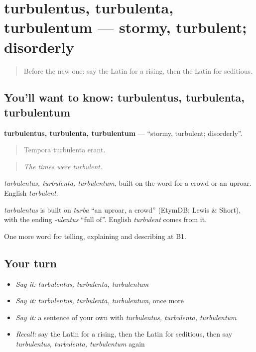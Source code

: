 \section[turbulentus, turbulenta, turbulentum]{turbulentus, turbulenta, turbulentum — stormy, turbulent; disorderly}

\label{lesson:LA-C387-turbulentus}



\begin{quote}
Before the new one: say the Latin for a rising, then the Latin for seditious.
\end{quote}

\subsection*{You'll want to know: turbulentus, turbulenta, turbulentum}
\textbf{turbulentus, turbulenta, turbulentum} — \textquotedblleft{}stormy, turbulent; disorderly\textquotedblright{}.

\begin{quote}
Tempora turbulenta erant.
\end{quote}

\begin{quote}
\emph{The times were turbulent.}
\end{quote}

\emph{turbulentus, turbulenta, turbulentum}, built on the word for a crowd or an uproar. English \emph{turbulent}.

\begin{cousinweb}
\emph{turbulentus} is built on \emph{turba} \textquotedblleft{}an uproar, a crowd\textquotedblright{} (EtymDB; Lewis \& Short), with the ending \emph{-ulentus} \textquotedblleft{}full of\textquotedblright{}. English \emph{turbulent} comes from it.
\end{cousinweb}

\begin{grammarlens}[title={What you've built}]
One more word for telling, explaining and describing at B1.
\end{grammarlens}

\subsection*{Your turn}
\begin{itemize}
\raggedright
  \item \emph{Say it:} \emph{turbulentus, turbulenta, turbulentum}
  \item \emph{Say it:} \emph{turbulentus, turbulenta, turbulentum}, once more
  \item \emph{Say it:} a sentence of your own with \emph{turbulentus, turbulenta, turbulentum}
  \item \emph{Recall:} say the Latin for a rising, then the Latin for seditious, then say \emph{turbulentus, turbulenta, turbulentum} again
\end{itemize}

